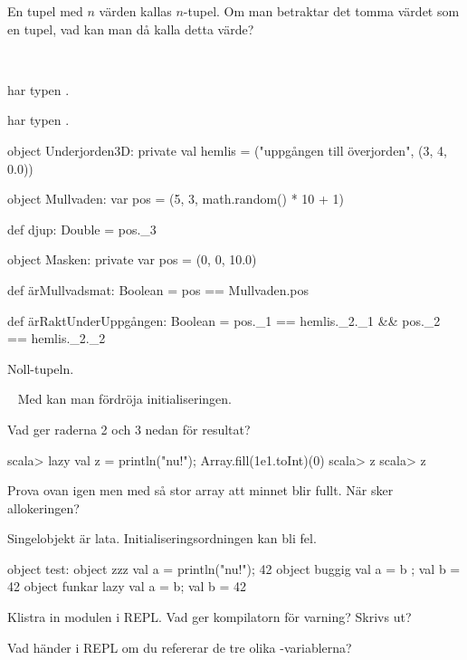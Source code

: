 \Subtask En tupel med $n$ värden kallas $n$-tupel. Om man betraktar det tomma värdet  \code{()} som en tupel, vad kan man då kalla detta värde?

\SOLUTION

\TaskSolved \what~

\SubtaskSolved {} har typen .

\SubtaskSolved {} har typen .


\SubtaskSolved
\begin{Code}
object Underjorden3D:
  private val hemlis = ("uppgången till överjorden", (3, 4, 0.0))

  object Mullvaden:
    var pos = (5, 3, math.random() * 10 + 1)

    def djup: Double  = pos._3

  object Masken:
    private var pos = (0, 0, 10.0)

    def ärMullvadsmat: Boolean = pos == Mullvaden.pos

    def ärRaktUnderUppgången: Boolean =
      pos._1 == hemlis._2._1 && pos._2 == hemlis._2._2
\end{Code}

\SubtaskSolved Noll-tupeln.

\QUESTEND



\QUESTBEGIN

\Task \what~ Med  kan man fördröja initialiseringen.

\Subtask Vad ger raderna 2 och 3 nedan för resultat?
\begin{REPL}
scala> lazy val z = { println("nu!"); Array.fill(1e1.toInt)(0)}
scala> z
scala> z
\end{REPL}

\Subtask Prova ovan igen men med så stor array att minnet blir fullt. När sker allokeringen?

\Subtask Singelobjekt är lata. Initialiseringsordningen kan bli fel.
\begin{Code}
object test:
  object zzz    { val a = { println("nu!"); 42} }
  object buggig { val a = b ; val b = 42        }
  object funkar { lazy val a = b; val b = 42    }
\end{Code}
\noindent Klistra in modulen  i REPL. Vad ger kompilatorn för varning? Skrivs   ut?

\Subtask Vad händer i REPL om du refererar de tre olika -variablerna?

